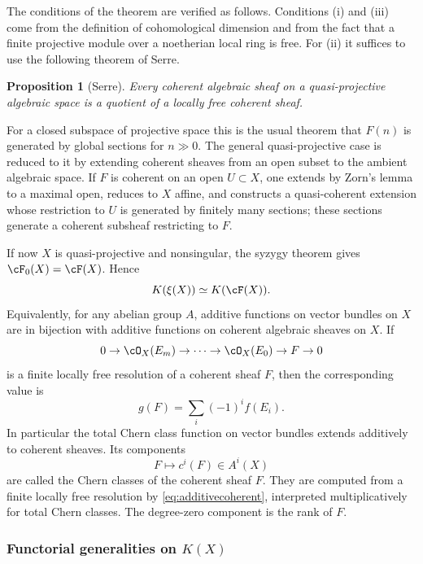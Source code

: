 \documentclass[11pt]{article}
\theoremstyle{plain}
\newtheorem*{proposition*}{Proposition}
\theoremstyle{definition}
\theoremstyle{remark}
\begin{document}
The conditions of the theorem are verified as follows. Conditions (i) and (iii) come from the definition of cohomological dimension and from the fact that a finite projective module over a noetherian local ring is free. For (ii) it suffices to use the following theorem of Serre.

\begin{proposition*}[Serre]
Every coherent algebraic sheaf on a quasi-projective algebraic space is a quotient of a locally free coherent sheaf.
\end{proposition*}

For a closed subspace of projective space this is the usual theorem that $F(n)$ is generated by global sections for $n\gg0$. The general quasi-projective case is reduced to it by extending coherent sheaves from an open subset to the ambient algebraic space. If $F$ is coherent on an open $U\subset X$, one extends by Zorn's lemma to a maximal open, reduces to $X$ affine, and constructs a quasi-coherent extension whose restriction to $U$ is generated by finitely many sections; these sections generate a coherent subsheaf restricting to $F$.

If now $X$ is quasi-projective and nonsingular, the syzygy theorem gives $\cF_0(X)=\cF(X)$. Hence
\begin{equation}\label{eq:Kvectorcoherent}
   K(\xi(X))\simeq K(\cF(X)).
\end{equation}
Equivalently, for any abelian group $A$, additive functions on vector bundles on $X$ are in bijection with additive functions on coherent algebraic sheaves on $X$. If
\[
   0\to \cO_X(E_m)\to\cdots\to\cO_X(E_0)\to F\to0
\]
is a finite locally free resolution of a coherent sheaf $F$, then the corresponding value is
\begin{equation}\label{eq:additivecoherent}
   g(F)=\sum_i(-1)^if(E_i).
\end{equation}
In particular the total Chern class function on vector bundles extends additively to coherent sheaves. Its components
\[
   F\longmapsto c^i(F)\in A^i(X)
\]
are called the Chern classes of the coherent sheaf $F$. They are computed from a finite locally free resolution by \eqref{eq:additivecoherent}, interpreted multiplicatively for total Chern classes. The degree-zero component is the rank of $F$.

\subsubsection{Functorial generalities on $K(X)$}
\end{document}
